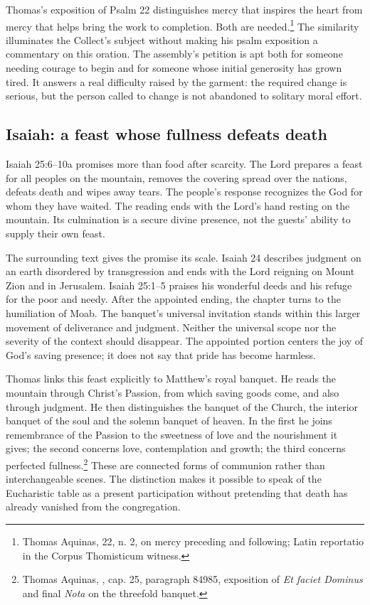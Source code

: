 Thomas's exposition of Psalm 22 distinguishes mercy that inspires the heart from mercy that helps bring the work to completion. Both are needed.\footnote{Thomas Aquinas,  22, n. 2, on mercy preceding and following; Latin reportatio in the Corpus Thomisticum witness.} The similarity illuminates the Collect's subject without making his psalm exposition a commentary on this oration. The assembly's petition is apt both for someone needing courage to begin and for someone whose initial generosity has grown tired. It answers a real difficulty raised by the garment: the required change is serious, but the person called to change is not abandoned to solitary moral effort.

\subsection{Isaiah: a feast whose fullness defeats death}
Isaiah 25:6--10a promises more than food after scarcity. The Lord prepares a feast for all peoples on the mountain, removes the covering spread over the nations, defeats death and wipes away tears. The people's response recognizes the God for whom they have waited. The reading ends with the Lord's hand resting on the mountain. Its culmination is a secure divine presence, not the guests' ability to supply their own feast.

The surrounding text gives the promise its scale. Isaiah 24 describes judgment on an earth disordered by transgression and ends with the Lord reigning on Mount Zion and in Jerusalem. Isaiah 25:1--5 praises his wonderful deeds and his refuge for the poor and needy. After the appointed ending, the chapter turns to the humiliation of Moab. The banquet's universal invitation stands within this larger movement of deliverance and judgment. Neither the universal scope nor the severity of the context should disappear. The appointed portion centers the joy of God's saving presence; it does not say that pride has become harmless.

Thomas links this feast explicitly to Matthew's royal banquet. He reads the mountain through Christ's Passion, from which saving goods come, and also through judgment. He then distinguishes the banquet of the Church, the interior banquet of the soul and the solemn banquet of heaven. In the first he joins remembrance of the Passion to the sweetness of love and the nourishment it gives; the second concerns love, contemplation and growth; the third concerns perfected fullness.\footnote{Thomas Aquinas, , cap. 25, paragraph 84985, exposition of \textit{Et faciet Dominus} and final \textit{Nota} on the threefold banquet.} These are connected forms of communion rather than interchangeable scenes. The distinction makes it possible to speak of the Eucharistic table as a present participation without pretending that death has already vanished from the congregation.

